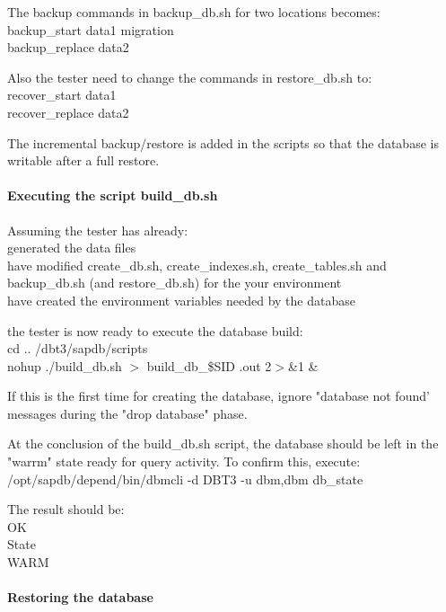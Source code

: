 \documentclass{article}
\begin{document}
\noindent
The backup commands in backup\_db.sh for two locations becomes: \\
\indent backup\_start data1 migration \\
\indent backup\_replace data2

\noindent
Also the tester need to change the commands in restore\_db.sh to: \\
\indent recover\_start data1 \\
\indent recover\_replace data2

\noindent
The incremental backup/restore is added in the scripts so that the
database is writable after a full restore.

\paragraph{Executing the script build\_db.sh}

\noindent
Assuming the tester has already: \\
\indent generated the data files \\
\indent have modified create\_db.sh, create\_indexes.sh, create\_tables.sh  and backup\_db.sh (and restore\_db.sh) for the your environment \\
\indent have created the environment variables needed by the database 

\noindent
the tester is now ready to execute the database build: \\
\indent cd .. /dbt3/sapdb/scripts \\
\indent nohup ./build\_db.sh $>$ build\_db\_\$SID .out 2$>$\&1 \&

\noindent
If this is the first time for creating the database, ignore "database
not found' messages during the "drop  database" phase.

\noindent
At the conclusion of the build\_db.sh script, the database should be
left in the "warrm" state ready for query activity.  To confirm this,
execute: \\
\indent /opt/sapdb/depend/bin/dbmcli -d DBT3 -u dbm,dbm db\_state

\noindent
The result should be: \\
\indent OK \\
\indent State \\
\indent WARM \\

\paragraph{Restoring the database}
\end{document}
